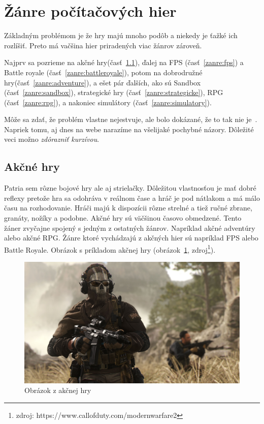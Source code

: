 \documentclass[10pt,oneside,slovak,a4paper]{article}
\begin{document}
\section{Žánre počítačových hier} \label{zanre}

Základným problémom je že hry majú mnoho podôb a niekedy je ťažké ich rozlíšiť. Preto má vačšina hier priradených viac žánrov zároveň.

Najprv sa pozrieme na akčné hry(časť~\ref{zanre:akcne}), ďalej na FPS (časť~\ref{zanre:fps}) a Battle royale (časť~\ref{zanre:battleroyale}), potom na dobrodružné hry(časť~\ref{zanre:adventure}), a ešet pár ďalších, ako sú Sandbox (časť~\ref{zanre:sandbox}), strategické hry (časť~\ref{zanre:strategicke}), RPG (časť~\ref{zanre:rpg}), a nakoniec simulátory (časť~\ref{zanre:simulatory}).

Môže sa zdať, že problém vlastne nejestvuje\cite{Coplien:MPD}, ale bolo dokázané, že to tak nie je~\cite{Czarnecki:Staged, Czarnecki:Progress}. Napriek tomu, aj dnes na webe narazíme na všelijaké pochybné názory\cite{PLP-Framework}. Dôležité veci možno \emph{zdôrazniť kurzívou}.

\cite{sahay}

\subsection{Akčné hry} \label{zanre:akcne}

Patria sem rôzne bojové hry ale aj strielačky. Dôležitou vlastnosťou je mať dobré reflexy pretože hra sa odohráva v reálnom čase a hráč je pod nátlakom a má málo času na rozhodovanie. Hráči majú k dispozícii rôzne strelné a tiež ručné zbrane, granáty, nožíky a podobne. Akčné hry sú väčšinou časovo obmedzené. Tento žáner zvyčajne spojený s jedným z ostatných žánrov. Napríklad akčné adventúry alebo akčné RPG. Žánre ktoré vychádzajú z akčných hier sú napríklad FPS alebo Battle Royale. Obrázok s príkladom akčnej hry (obrázok~\ref{f:akcne}, zdroj\footnote{zdroj: https://www.callofduty.com/modernwarfare2}).

\begin{figure}[tbh]
\centering
\includegraphics[scale=0.1]{mw2.jpg}
\caption{Obrázok z akčnej hry}
\label{f:akcne}
\end{figure}
\end{document}
